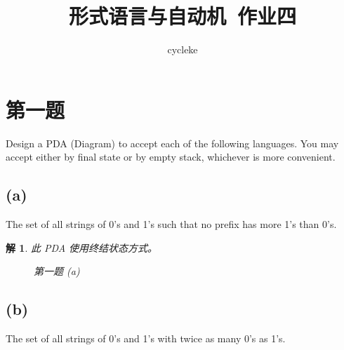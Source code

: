 \documentclass[12pt,onecolumn]{article}
\title{形式语言与自动机~作业四}
\author{cycleke}
\date{}
\theoremstyle{plain}
\newtheorem{solution}{解}[section]
\begin{document}
\maketitle
\thispagestyle{fancy}

\section{第一题}
Design a PDA (Diagram) to accept each of the following languages.
You may accept either by final state or by empty stack,
whichever is more convenient.
\subsection{(a)}
The set of all strings of 0's and 1's such that
no prefix has more 1’s than 0's.

\begin{solution}
 此 PDA 使用终结状态方式。
 \begin{figure}[H]
 \centering
 \caption{第一题 (a)}
 \end{figure}
\end{solution}

\subsection{(b)}
The set of all strings of 0's and 1's with twice as many 0's as 1's.
\end{document}
